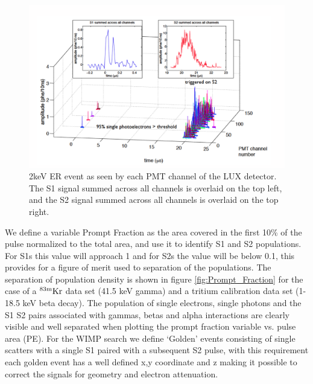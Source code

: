  \begin{figure}[h!]\centering
\includegraphics[width=130mm]{Chapter_LUX_Det/LUX_Golden_Event_2keV.png}
\caption{ 2keV ER event as seen by each PMT channel of the LUX detector. The S1 signal summed across all channels is overlaid on the top left, and the S2 signal summed across all channels is overlaid on the top right.}
\label{fig:LUX_Golden}
\end{figure}

We define a variable Prompt Fraction as the area covered in the first 10\% of the pulse normalized to the total area, and use it to identify S1 and S2 populations. For S1s this value will approach 1 and for S2s the value will be below 0.1, this provides for a figure of merit used to separation of the populations. The separation of population density is shown in figure \ref{fig:Prompt_Fraction} for the case of a $\rm ^{83m}Kr$ data set (41.5 keV gamma) and a tritium calibration data set (1-18.5 keV beta decay). The population of single electrons, single photons and the S1 S2 pairs associated with gammas, betas and alpha interactions are clearly visible and well separated when plotting the prompt  fraction variable vs. pulse area (PE). For the WIMP search we define `Golden' events consisting of single scatters with a single S1 paired with a subsequent S2 pulse, with this requirement each golden event has a well defined x,y coordinate and z making it possible to correct the signals for geometry and electron attenuation.

